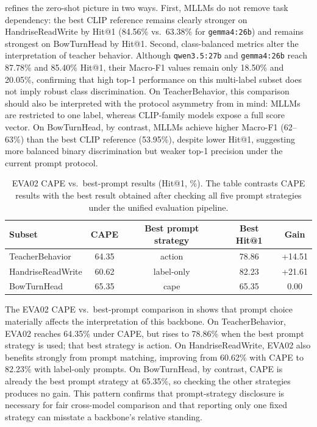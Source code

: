 \documentclass[symmetry,article,submit,pdftex,moreauthors]{Definitions/mdpi}
\begin{document}
 refines the zero-shot picture in two ways. First, MLLMs do not remove task dependency: the best CLIP reference remains clearly stronger on HandriseReadWrite by Hit@1 (84.56\% vs.\ 63.38\% for \texttt{gemma4:26b}) and remains strongest on BowTurnHead by Hit@1. Second, class-balanced metrics alter the interpretation of teacher behavior. Although \texttt{qwen3.5:27b} and \texttt{gemma4:26b} reach 87.78\% and 85.40\% Hit@1, their Macro-F1 values remain only 18.50\% and 20.05\%, confirming that high top-1 performance on this multi-label subset does not imply robust class discrimination. On TeacherBehavior, this comparison should also be interpreted with the protocol asymmetry from  in mind: MLLMs are restricted to one label, whereas CLIP-family models expose a full score vector. On BowTurnHead, by contrast, MLLMs achieve higher Macro-F1 (62--63\%) than the best CLIP reference (53.95\%), despite lower Hit@1, suggesting more balanced binary discrimination but weaker top-1 precision under the current prompt protocol.

\begin{table}[H]
\caption{EVA02 CAPE vs.\ best-prompt results (Hit@1, \%). The table contrasts CAPE results with the best result obtained after checking all five prompt strategies under the unified evaluation pipeline.}
\label{tab:eva02_prompt_check}
\centering
\small
\begin{tabular}{l c c c c}
\toprule
\textbf{Subset} & \textbf{CAPE} & \textbf{Best prompt strategy} & \textbf{Best Hit@1} & \textbf{Gain} \\
\midrule
TeacherBehavior & 64.35 & action & 78.86 & +14.51 \\
HandriseReadWrite & 60.62 & label-only & 82.23 & +21.61 \\
BowTurnHead & 65.35 & cape & 65.35 & 0.00 \\
\bottomrule
\end{tabular}
\end{table}

The EVA02 CAPE vs.\ best-prompt comparison in  shows that prompt choice materially affects the interpretation of this backbone. On TeacherBehavior, EVA02 reaches 64.35\% under CAPE, but rises to 78.86\% when the best prompt strategy is used; that best strategy is action. On HandriseReadWrite, EVA02 also benefits strongly from prompt matching, improving from 60.62\% with CAPE to 82.23\% with label-only prompts. On BowTurnHead, by contrast, CAPE is already the best prompt strategy at 65.35\%, so checking the other strategies produces no gain. This pattern confirms that prompt-strategy disclosure is necessary for fair cross-model comparison and that reporting only one fixed strategy can misstate a backbone's relative standing.
\end{document}
